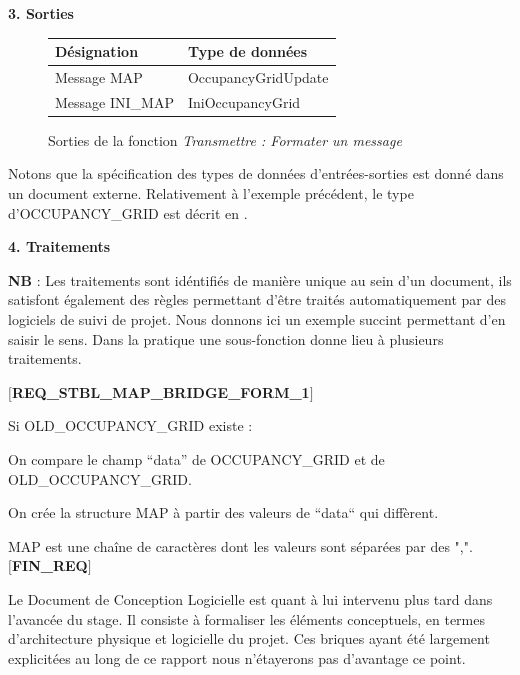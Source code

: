   \textbf{3. Sorties }
  \begin{figure}[!h]
    \begin{center}
      \begin{tabular}{|l|l|}
	\hline
	\textbf{Désignation} & \textbf{Type de données} \\
	\hline
	Message MAP & OccupancyGridUpdate \\
	Message INI\_MAP & IniOccupancyGrid \\
	\hline
      \end{tabular}
    \end{center}
    \caption{Sorties de la fonction \emph{Transmettre : Formater un message}}
  \end{figure}
  
  Notons que la spécification des types de données d'entrées-sorties est donné dans un document externe. 
  Relativement à l'exemple précédent, le type d'OCCUPANCY\_GRID est décrit en .  
  
  \textbf{4. Traitements }
  
  \textbf{NB} : Les traitements sont idéntifiés de manière unique au sein d'un document, ils satisfont également des règles permettant d'être traités automatiquement par des logiciels de suivi de projet. 
  Nous donnons ici un exemple succint permettant d'en saisir le sens. Dans la pratique une sous-fonction donne lieu à plusieurs traitements.
  
  \textbf{$[$REQ\_STBL\_MAP\_BRIDGE\_FORM\_1$]$}
  
    \hspace{10mm} Si OLD\_OCCUPANCY\_GRID existe : 
    
    \hspace{10mm} On compare le champ ``data'' de OCCUPANCY\_GRID et de 
    \\ OLD\_OCCUPANCY\_GRID. 
    
    \hspace{10mm} On crée la structure MAP à partir des valeurs de ``data`` qui diffèrent. 
    
    \hspace{10mm} MAP est une chaîne de caractères dont les valeurs sont séparées par des ",".\\ 
  \textbf{$[$FIN\_REQ$]$}
  
  Le Document de Conception Logicielle est quant à lui intervenu plus tard dans l'avancée du stage. 
  Il consiste à formaliser les éléments conceptuels, en termes d'architecture physique et logicielle du projet. 
  Ces briques ayant été largement explicitées au long de ce rapport nous n'étayerons pas d'avantage ce point. 
  
